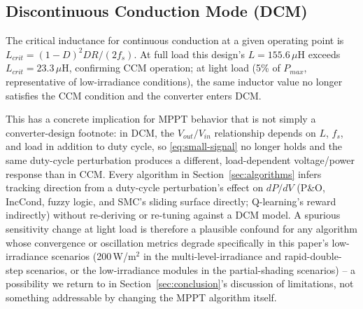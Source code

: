 \subsection{Discontinuous Conduction Mode (DCM)}
The critical inductance for continuous conduction at a given operating point
is $L_{crit} = (1-D)^2 D R / (2 f_s)$. At full load this design's
$L=155.6\,\mu$H exceeds $L_{crit}=23.3\,\mu$H, confirming CCM operation; at
light load (5\% of $P_{max}$, representative of low-irradiance conditions),
the same inductor value no longer satisfies the CCM condition and the
converter enters DCM.

This has a concrete implication for MPPT behavior that is not simply a
converter-design footnote: in DCM, the $V_{out}/V_{in}$ relationship depends
on $L$, $f_s$, and load in addition to duty cycle, so \eqref{eq:small-signal}
no longer holds and the same duty-cycle perturbation produces a different,
load-dependent voltage/power response than in CCM. Every algorithm in
Section~\ref{sec:algorithms} infers tracking direction from a duty-cycle
perturbation's effect on $dP/dV$ (P\&O, IncCond, fuzzy logic, and SMC's
sliding surface directly; Q-learning's reward indirectly) without
re-deriving or re-tuning against a DCM model. A spurious sensitivity change
at light load is therefore a plausible confound for any algorithm whose
convergence or oscillation metrics degrade specifically in this paper's
low-irradiance scenarios (200\,W/m$^2$ in the multi-level-irradiance and
rapid-double-step scenarios, or the low-irradiance modules in the
partial-shading scenarios) -- a possibility we return to in
Section~\ref{sec:conclusion}'s discussion of limitations, not something
addressable by changing the MPPT algorithm itself.
